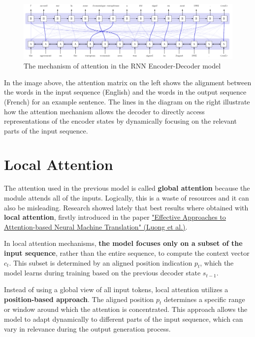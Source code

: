 \begin{figure}[!htbp]
    \centering
    \includegraphics[width=\linewidth]{tikz/chapter7 - Attention is Alignment 2.pdf}
    \caption{The mechanism of attention in the RNN Encoder-Decoder model}
\end{figure}

In the image above, the attention matrix on the left shows the alignment between the words in the input sequence (English) and the words in the output sequence (French) for an example sentence. The lines in the diagram on the right illustrate how the attention mechanism allows the decoder to directly access representations of the encoder states by dynamically focusing on the relevant parts of the input sequence.


\section{Local Attention}

The attention used in the previous model is called \textbf{global attention} because the module attends all of the inputs. Logically, this is a waste of resources and it can also be misleading. Research showed lately that best results where obtained with \textbf{local attention}, firstly introduced in the paper \href{https://arxiv.org/pdf/1508.04025}{"Effective Approaches to Attention-based Neural Machine Translation" (Luong et al.)}.

In local attention mechanisms, \textbf{the model focuses only on a subset of the input sequence}, rather than the entire sequence, to compute the context vector $c_t$. This subset is determined by an aligned position indication $p_t$, which the model learns during training based on the previous decoder state $s_{t-1}$.

Instead of using a global view of all input tokens, local attention utilizes a \textbf{position-based approach}. The aligned position $p_t$ determines a specific range or window around which the attention is concentrated. This approach allows the model to adapt dynamically to different parts of the input sequence, which can vary in relevance during the output generation process.

